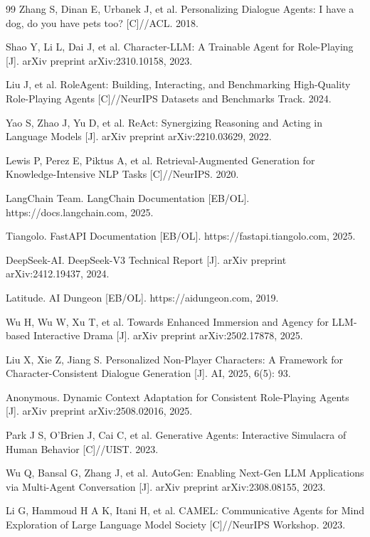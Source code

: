 \documentclass[UTF8,oneside,a4paper]{ctexart}
\begin{document}
\newpage
\begin{thebibliography}{99}
Zhang S, Dinan E, Urbanek J, et al. Personalizing Dialogue Agents: I have a dog, do you have pets too? [C]//ACL. 2018.

Shao Y, Li L, Dai J, et al. Character-LLM: A Trainable Agent for Role-Playing [J]. arXiv preprint arXiv:2310.10158, 2023.

Liu J, et al. RoleAgent: Building, Interacting, and Benchmarking High-Quality Role-Playing Agents [C]//NeurIPS Datasets and Benchmarks Track. 2024.

Yao S, Zhao J, Yu D, et al. ReAct: Synergizing Reasoning and Acting in Language Models [J]. arXiv preprint arXiv:2210.03629, 2022.

Lewis P, Perez E, Piktus A, et al. Retrieval-Augmented Generation for Knowledge-Intensive NLP Tasks [C]//NeurIPS. 2020.

LangChain Team. LangChain Documentation [EB/OL]. https://docs.langchain.com, 2025.

Tiangolo. FastAPI Documentation [EB/OL]. https://fastapi.tiangolo.com, 2025.

DeepSeek-AI. DeepSeek-V3 Technical Report [J]. arXiv preprint arXiv:2412.19437, 2024.

Latitude. AI Dungeon [EB/OL]. https://aidungeon.com, 2019.

Wu H, Wu W, Xu T, et al. Towards Enhanced Immersion and Agency for LLM-based Interactive Drama [J]. arXiv preprint arXiv:2502.17878, 2025.

Liu X, Xie Z, Jiang S. Personalized Non-Player Characters: A Framework for Character-Consistent Dialogue Generation [J]. AI, 2025, 6(5): 93.

Anonymous. Dynamic Context Adaptation for Consistent Role-Playing Agents [J]. arXiv preprint arXiv:2508.02016, 2025.

Park J S, O'Brien J, Cai C, et al. Generative Agents: Interactive Simulacra of Human Behavior [C]//UIST. 2023.

Wu Q, Bansal G, Zhang J, et al. AutoGen: Enabling Next-Gen LLM Applications via Multi-Agent Conversation [J]. arXiv preprint arXiv:2308.08155, 2023.

Li G, Hammoud H A K, Itani H, et al. CAMEL: Communicative Agents for Mind Exploration of Large Language Model Society [C]//NeurIPS Workshop. 2023.
\end{thebibliography}
\end{document}
